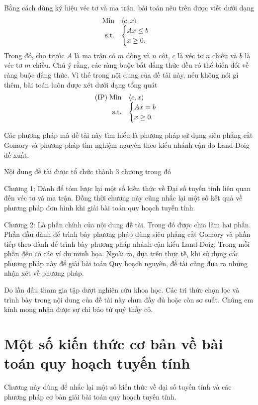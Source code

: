 \documentclass[12pt,a4paper]{report}
\begin{document}
Bằng cách dùng ký hiệu véc tơ và ma trận, bài toán nêu trên được viết dưới dạng 
$$
\begin{array}{rl}
{\rm Min}& \langle c,x \rangle \\
{\rm s.t.}& 
\begin{cases}Ax \le b\\
 x\ge 0.
 \end{cases}
\end{array}
$$
Trong đó, cho trước $A$ là ma trận có $m$ dòng và $n$ cột, $c$ là véc tơ $n$ chiều và $b$ là véc tơ $m$ chiều. Chú ý rằng, các ràng buộc bất đẳng thức đều có thể biến đổi về ràng buộc đẳng thức. Vì thế trong nội dung của đề tài này, nếu không nói gì thêm, bài toán luôn được xét dưới dạng tổng quát
$$
\begin{array}{rl}
{\rm (IP) \; Min}& \langle c,x \rangle \\
{\rm s.t.}& 
\begin{cases}Ax = b\\
 x\ge 0.
 \end{cases}
\end{array}
$$

Các phương pháp mà đề tài này tìm hiểu là phương pháp sử dụng siêu phẳng cắt Gomory và phương pháp tìm nghiệm nguyên theo kiểu nhánh-cận do Land-Doig đề xuất. 

Nội dung đề tài được tổ chức thành 3 chương trong đó 

Chương 1; Dành để tóm lược lại một số kiến thức về Đại số tuyến tính liên quan đến véc tơ và ma trận. Đồng thời chương này cũng nhắc lại một số kết quả về phương pháp đơn hình khi giải bài toán quy hoạch tuyến tính.

Chương 2: Là phần chính của nội dung đề tài. Trong đó được chia làm hai phần. Phần đầu dành để trình bày phương pháp dùng siêu phẳng cắt Gomory và phần tiếp theo dành để trình bày phương pháp nhánh-cận kiểu Land-Doig. Trong mỗi phần đều có các ví dụ minh họa. Ngoài ra, dựa trên thực tế, khi sử dụng các phương pháp này để giải bài toán Quy hoạch nguyên, đề tài cũng đưa ra những nhận xét về phương pháp.

Do lần đầu tham gia tập dượt nghiên cứu khoa học. Các tri thức chọn lọc và trình bày trong nội dung của đề tài này chưa đầy đủ hoặc còn sơ suất. Chúng em kính mong nhận được sự chỉ bảo từ quý thầy cô.

\newpage
\renewcommand{\baselinestretch}{1.2}
 
\chapter{Một số kiến thức cơ bản về bài toán quy hoạch tuyến tính}
Chương này dùng để nhắc lại một số kiến thức về đại số tuyến tính và các phương pháp cơ bản giải bài toán quy hoạch tuyến tính.
\end{document}
